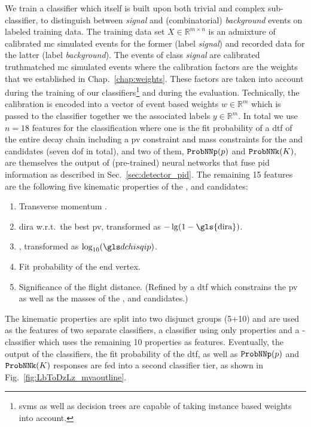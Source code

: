 We train a classifier which itself is built upon both trivial and complex sub-classifier, to distinguish between \textit{signal} and (combinatorial) \textit{background} events on labeled training data.
The training data set $X \in \mathbb{R}^{m \times n}$ is an admixture of calibrated \gls{mc} simulated events for the former (label \textit{signal}) and recorded data for the latter (label \textit{background}).
The events of class \textit{signal} are calibrated \gls{truthmatched} \gls{mc} simulated events where the calibration factors are the weights that we established in Chap.~\ref{chap:weights}.
These factors are taken into account during the training of our classifiers\footnote{\Glspl{svm} as well as decision trees are capable of taking instance based weights into account.} and during the evaluation.
Technically, the calibration is encoded into a vector of event based weights $w \in \mathbb{R}^m$ which is passed to the classifier together we the associated labels $y \in \mathbb{R}^{m}$.
In total we use $n=18$ features for the classification where one is the fit probability of a \gls{dtf} of the entire decay chain \decay{\Lb}{\Dz\Lz} including a \gls{pv} constraint and mass constraints for the \Dz and \Lz candidates (seven \gls{dof} in total), and two of them, $\texttt{ProbNNp}({p})$ and $\texttt{ProbNNk}({K})$, are themselves the output of (pre-trained) neural networks that fuse \gls{pid} information as described in Sec.~\ref{sec:detector_pid}.
The remaining 15 features are the following five kinematic properties of the \Lz, \Dz and \Lb candidates:
\begin{enumerate}[itemsep=2pt,parsep=2pt]
    \item Transverse momentum \pt.
    \item \gls{dira} w.r.t.\ the best \gls{pv}, transformed as $-\lg(1 - \text{\gls{dira}})$. 
    \item \dchisqip, transformed as $\log_{10}(\dchisqip)$.
    \item Fit probability of the end vertex.
    \item Significance of the flight distance. (Refined by a \gls{dtf} which constrains the \gls{pv} as well as the masses of the \Lz, \Dz and \Lb candidates.)
\end{enumerate}
The kinematic properties are split into two disjunct groups (5+10) and are used as the features of two separate classifiers, a \Lz classifier using only \Lz properties and a \Lb-\Dz classifier which uses the remaining 10 properties as features.
Eventually, the output of the classifiers, the fit probability of the \gls{dtf}, as well as $\texttt{ProbNNp}({p})$ and $\texttt{ProbNNk}({K})$ responses are fed into a second classifier tier, as shown in Fig.~\ref{fig:LbToDzLz_mvaoutline}.
